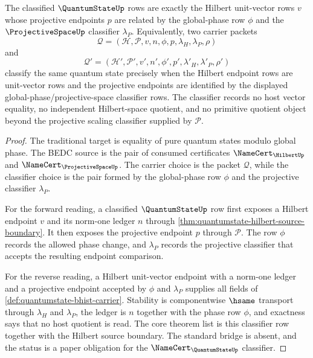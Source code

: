\begin{theorem}
\label{thm:quantumstate-projective-phase-classifier}
The classified $\QuantumStateUp$ rows are exactly the Hilbert unit-vector rows
$v$ whose projective endpoints $p$ are related by the global-phase row $\phi$
and the $\ProjectiveSpaceUp$ classifier $\lambda_P$. Equivalently, two carrier
packets
$$
\mathcal{Q}=(\mathcal{H},\mathcal{P},v,n,\phi,p,\lambda_H,\lambda_P,\rho)
$$
and
$$
\mathcal{Q}'=(\mathcal{H}',\mathcal{P}',v',n',\phi',p',\lambda'_H,\lambda'_P,\rho')
$$
classify the same quantum state precisely when the Hilbert endpoint rows are
unit-vector rows and the projective endpoints are identified by the displayed
global-phase/projective-space classifier rows. The classifier records no host
vector equality, no independent Hilbert-space quotient, and no primitive
quotient object beyond the projective scaling classifier supplied by
$\mathcal{P}$.
\end{theorem}
\begin{proof}
The traditional target is equality of pure quantum states modulo global phase.
The BEDC source is the pair of consumed certificates
$\NameCert_{\HilbertUp}$ and $\NameCert_{\ProjectiveSpaceUp}$. The carrier
choice is the packet $\mathcal{Q}$, while the classifier choice is the pair
formed by the global-phase row $\phi$ and the projective classifier
$\lambda_P$.

For the forward reading, a classified $\QuantumStateUp$ row first exposes a
Hilbert endpoint $v$ and its norm-one ledger $n$ through
\autoref{thm:quantumstate-hilbert-source-boundary}. It then exposes the
projective endpoint $p$ through $\mathcal{P}$. The row $\phi$ records the
allowed phase change, and $\lambda_P$ records the projective classifier that
accepts the resulting endpoint comparison.

For the reverse reading, a Hilbert unit-vector endpoint with a norm-one ledger
and a projective endpoint accepted by $\phi$ and $\lambda_P$ supplies all fields
of \autoref{def:quantumstate-bhist-carrier}. Stability is componentwise
$\hsame$ transport through $\lambda_H$ and $\lambda_P$, the ledger is $n$
together with the phase row $\phi$, and exactness says that no host quotient is
read. The core theorem list is this classifier row together with the Hilbert
source boundary. The standard bridge is absent, and the status is a paper
obligation for the $\NameCert_{\QuantumStateUp}$ classifier.
\end{proof}

